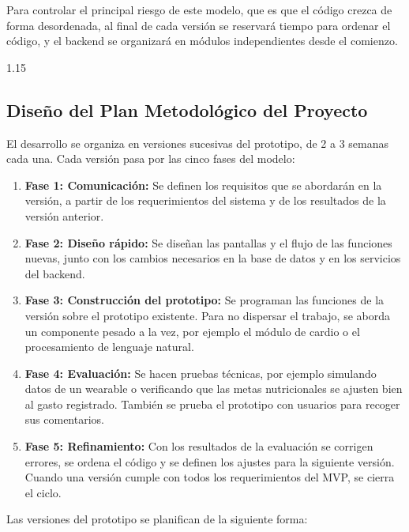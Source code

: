 Para controlar el principal riesgo de este modelo, que es que el código crezca de forma desordenada, al final de cada versión se reservará tiempo para ordenar el código, y el backend se organizará en módulos independientes desde el comienzo.
\begin{spacing}{1.15}
\subsection{Diseño del Plan Metodológico del Proyecto}

El desarrollo se organiza en versiones sucesivas del prototipo, de 2 a 3 semanas cada una. Cada versión pasa por las cinco fases del modelo:

\begin{enumerate}
    \item \textbf{Fase 1: Comunicación:}
    Se definen los requisitos que se abordarán en la versión, a partir de los requerimientos del sistema y de los resultados de la versión anterior.

    \item \textbf{Fase 2: Diseño rápido:}
    Se diseñan las pantallas y el flujo de las funciones nuevas, junto con los cambios necesarios en la base de datos y en los servicios del backend.

    \item \textbf{Fase 3: Construcción del prototipo:}
    Se programan las funciones de la versión sobre el prototipo existente. Para no dispersar el trabajo, se aborda un componente pesado a la vez, por ejemplo el módulo de cardio o el procesamiento de lenguaje natural.

    \item \textbf{Fase 4: Evaluación:}
    Se hacen pruebas técnicas, por ejemplo simulando datos de un wearable o verificando que las metas nutricionales se ajusten bien al gasto registrado. También se prueba el prototipo con usuarios para recoger sus comentarios.

    \item \textbf{Fase 5: Refinamiento:}
    Con los resultados de la evaluación se corrigen errores, se ordena el código y se definen los ajustes para la siguiente versión. Cuando una versión cumple con todos los requerimientos del MVP, se cierra el ciclo.
\end{enumerate}

Las versiones del prototipo se planifican de la siguiente forma:


\end{spacing}
